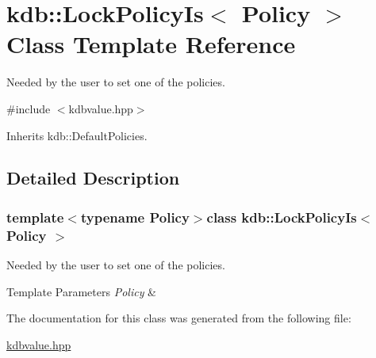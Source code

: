 \hypertarget{classkdb_1_1LockPolicyIs}{\section{kdb\+:\+:Lock\+Policy\+Is$<$ Policy $>$ Class Template Reference}
\label{classkdb_1_1LockPolicyIs}
}


Needed by the user to set one of the policies.  




{\ttfamily \#include $<$kdbvalue.\+hpp$>$}



Inherits kdb\+::\+Default\+Policies.



\subsection{Detailed Description}
\subsubsection*{template$<$typename Policy$>$class kdb\+::\+Lock\+Policy\+Is$<$ Policy $>$}

Needed by the user to set one of the policies. 


\begin{DoxyTemplParams}{Template Parameters}
{\em Policy} & \\
\hline
\end{DoxyTemplParams}


The documentation for this class was generated from the following file\+:\begin{DoxyCompactItemize}
\item 
\hyperlink{kdbvalue_8hpp}{kdbvalue.\+hpp}\end{DoxyCompactItemize}
